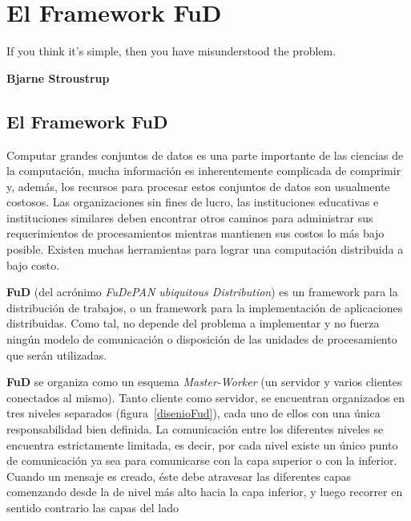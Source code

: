 \chapter{El Framework FuD}
\label{fudcplusplus}

\epigraph{If you think it’s simple, then you
have misunderstood the problem.
}%
{\textbf{Bjarne Stroustrup}}

\section{El Framework FuD}
\par Computar grandes conjuntos de datos es una parte importante de las ciencias de la computación, mucha información es inherentemente complicada de comprimir y, además, los recursos para procesar estos conjuntos de datos son usualmente costosos. Las organizaciones sin fines de lucro, las instituciones educativas e instituciones similares deben encontrar otros caminos para administrar sus requerimientos de procesamientos mientras mantienen sus costos lo más bajo posible. Existen muchas herramientas para lograr una computación distribuida a bajo costo.

\par \textbf{FuD} (del acrónimo \emph{FuDePAN ubiquitous Distribution}) es un framework para la distribución de trabajos, o un framework para la implementación de aplicaciones distribuidas\cite{clus09}. Como tal, no depende del problema a implementar y no fuerza ningún modelo de comunicación o disposición de las unidades de procesamiento que serán utilizadas. 

\par \textbf{FuD} se organiza como un esquema \emph{Master-Worker} (un servidor y varios clientes conectados al mismo). Tanto cliente como servidor, se encuentran organizados en tres niveles separados (figura~\ref{disenioFud}), cada uno de ellos con una única responsabilidad bien definida. La comunicación entre los diferentes niveles se encuentra estrictamente
limitada, es decir, por cada nivel existe un único punto de comunicación ya sea para comunicarse con la capa
superior o con la inferior. Cuando un mensaje es creado, éste debe atravesar las diferentes capas comenzando
desde la de nivel más alto hacia la capa inferior, y luego recorrer en sentido contrario las capas del lado

